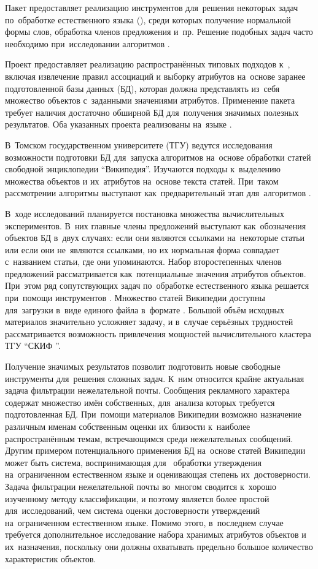 Пакет  предоставляет реализацию инструментов для~решения некоторых задач по~обработке естественного языка (),
среди которых получение нормальной формы слов, обработка членов предложения и~пр.
Решение подобных задач часто необходимо при~исследовании алгоритмов .

Проект  предоставляет реализацию распространённых типовых подходов к~,
включая извлечение правил ассоциаций и выборку атрибутов на~основе заранее подготовленной базы данных (БД),
которая должна представлять из~себя множество объектов с~заданными значениями атрибутов.
Применение пакета  требует наличия достаточно обширной БД для~получения значимых полезных результатов. 
Оба указанных проекта реализованы на~языке .

В~Томском государственном университете (ТГУ) ведутся исследования возможности подготовки БД для~запуска алгоритмов  на~основе обработки статей свободной энциклопедии ``Википедия''.
Изучаются подходы к~выделению множества объектов и их~атрибутов на~основе текста статей. 
При~таком рассмотрении алгоритмы  выступают как~предварительный этап для~алгоритмов .

В~ходе исследований планируется постановка множества вычислительных экспериментов. 
В~них главные члены предложений выступают как~обозначения объектов БД в~двух случаях:
если они являются ссылками на~некоторые статьи или 
если они не~являются ссылками, но их нормальная форма совпадает с~названием статьи, где они упоминаются.
Набор второстепенных членов предложений рассматривается как~потенциальные значения атрибутов объектов.
При~этом ряд сопутствующих задач по~обработке естественного языка  решается при~помощи инструментов .
Множество статей  Википедии доступны для~загрузки в~виде единого файла в~формате .
Большой объём исходных материалов значительно усложняет задачу,
и в~случае серьёзных трудностей рассматривается возможность привлечения мощностей вычислительного кластера ТГУ ``СКИФ ''.

Получение значимых результатов позволит подготовить новые свободные инструменты для~решения сложных задач.  
К~ним относится крайне актуальная задача фильтрации нежелательной почты.
Сообщения рекламного характера содержат множество имён собственных,
для~анализа которых требуется  подготовленная БД.
При~помощи материалов Википедии возможно назначение различным именам собственным оценки 
их~близости к~наиболее распространённым темам, встречающимся среди нежелательных сообщений.
Другим примером потенциального применения БД на~основе статей Википедии 
может быть система, воспринимающая для~ обработки утверждения на~ограниченном естественном языке 
и оценивающая степень их~достоверности. 
Задача фильтрации нежелательной почты   во~многом сводится к~хорошо изученному методу классификации,
и поэтому является более простой для~исследований, чем система оценки достоверности утверждений на~ограниченном естественном языке.
Помимо этого, в~последнем случае требуется дополнительное исследование набора хранимых атрибутов объектов и их~назначения,
поскольку они должны охватывать предельно большое количество характеристик объектов. 

